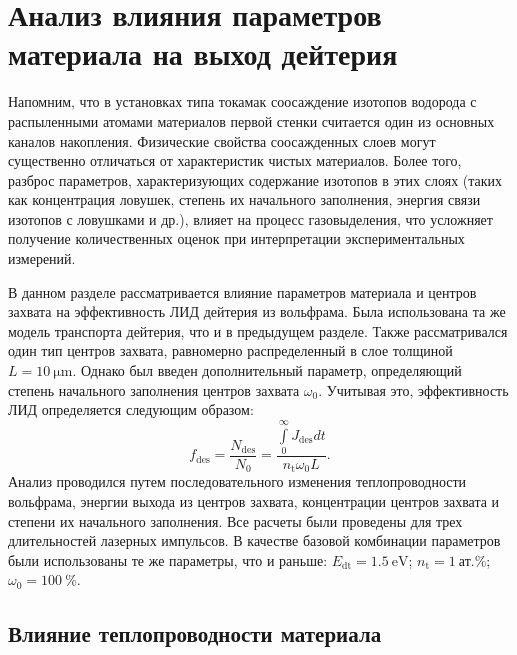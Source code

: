 \section{Анализ влияния параметров материала на выход дейтерия}\label{sec:ch4/seс3}
Напомним, что в установках типа токамак соосаждение изотопов водорода с распыленными атомами материалов первой стенки считается один из основных каналов накопления. Физические свойства соосажденных слоев могут существенно отличаться от характеристик чистых материалов. Более того, разброс параметров, характеризующих содержание изотопов в этих слоях (таких как концентрация ловушек, степень их начального заполнения, энергия связи изотопов с ловушками и др.), влияет на процесс газовыделения, что усложняет получение количественных оценок при интерпретации экспериментальных измерений.

В данном разделе рассматривается влияние параметров материала и центров захвата на эффективность ЛИД дейтерия из вольфрама. Была использована та же модель транспорта дейтерия, что и в предыдущем разделе. Также рассматривался один тип центров захвата, равномерно распределенный в слое толщиной \( L=\SI{10}{\micro\meter}\). Однако был введен дополнительный параметр, определяющий степень начального заполнения центров захвата \(\omega_0 \). Учитывая это, эффективность ЛИД определяется следующим образом:
\begin{equation}
    f_\mathrm{des} = \dfrac{N_\mathrm{des}}{N_0}=\dfrac{\int\limits_0^\infty J_\mathrm{des}dt}{n_\mathrm{t}\omega_0 L}.
\end{equation}
Анализ проводился путем последовательного изменения теплопроводности вольфрама, энергии выхода из центров захвата, концентрации центров захвата и степени их начального заполнения. Все расчеты были проведены для трех длительностей лазерных импульсов. В качестве базовой комбинации параметров были использованы те же параметры, что и раньше: \(E_\mathrm{dt}=\SI{1.5}{\electronvolt} \); \( n_\mathrm{t}=\SI{1}{\text{ат.}\percent} \); \( \omega_0=\SI{100}{\percent} \).

\subsection{Влияние теплопроводности материала}\label{subsec:ch4/seс3/subsec1}


